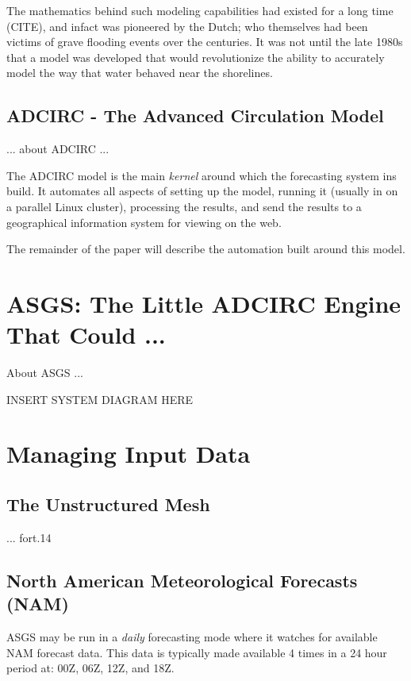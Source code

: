 \documentclass{article}
\begin{document}
The mathematics behind such modeling capabilities had existed for a long time (CITE),
and infact was pioneered by the Dutch; who themselves had been victims of grave
flooding events over the centuries. It was not until the late 1980s that a
model was developed that would revolutionize the ability to accurately model
the way that water behaved near the shorelines.

\subsection{ADCIRC - The Advanced Circulation Model}

... about ADCIRC \cite{luettich1992adcirc} ...

The ADCIRC model is the main \textit{kernel} around which the forecasting system
ins build. It automates all aspects of setting up the model, running it (usually
in on a parallel Linux cluster), processing the results, and send the results to
a geographical information system for viewing on the web.

The remainder of the paper will describe the automation built around this model.

\section{ASGS: The Little ADCIRC Engine That Could ...}

About ASGS ... \cite{fleming08}

INSERT SYSTEM DIAGRAM HERE

\section{Managing Input Data}

\subsection{The Unstructured Mesh}

... fort.14

\subsection{North American Meteorological Forecasts (NAM)}

ASGS may be run in a \textit{daily} forecasting mode where it watches for
available NAM forecast data. This data is typically made available 4 times in a
24 hour period at: 00Z, 06Z, 12Z, and 18Z.
\end{document}
